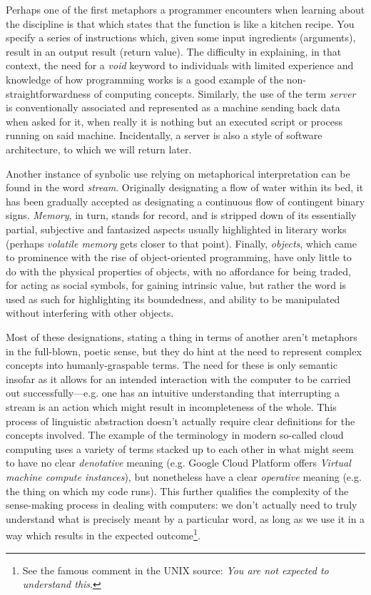 \documentclass{article}
\begin{document}
Perhaps one of the first metaphors a programmer encounters when learning about the discipline is that which states that the function is like a kitchen recipe. You specify a series of instructions which, given some input ingredients (arguments), result in an output result (return value). The difficulty in explaining, in that context, the need for a \emph{void} keyword to individuals with limited experience and knowledge of how programming works is a good example of the non-straightforwardness of computing concepts. Similarly, the use of the term \emph{server} is conventionally associated and represented as a machine sending back data when asked for it, when really it is nothing but an executed script or process running on said machine. Incidentally, a server is also a style of software architecture, to which we will return later.

Another instance of synbolic use relying on metaphorical interpretation can be found in the word \emph{stream}. Originally designating a flow of water within its bed, it has been gradually accepted as designating a continuous flow of contingent binary signs. \emph{Memory}, in turn, stands for record, and is stripped down of its essentially partial, subjective and fantasized aspects usually highlighted in literary works (perhaps \emph{volatile memory} gets closer to that point). Finally, \emph{objects}, which came to prominence with the rise of object-oriented programming, have only little to do with the physical properties of objects, with no affordance for being traded, for acting as social symbols, for gaining intrinsic value, but rather the word is used as such for highlighting its boundedness, and ability to be manipulated without interfering with other objects.

Most of these designations, stating a thing in terms of another aren't metaphors in the full-blown, poetic sense, but they do hint at the need to represent complex concepts into humanly-graspable terms. The need for these is only semantic insofar as it allows for an intended interaction with the computer to be carried out successfully—e.g. one has an intuitive understanding that interrupting a stream is an action which might result in incompleteness of the whole. This process of linguistic abstraction doesn't actually require clear definitions for the concepts involved. The example of the terminology in modern so-called cloud computing uses a variety of terms stacked up to each other in what might seem to have no clear \emph{denotative} meaning (e.g. Google Cloud Platform offers \emph{Virtual machine compute instances}), but nonetheless have a clear \emph{operative} meaning (e.g. the thing on which my code runs). This further qualifies the complexity of the sense-making process in dealing with computers: we don't actually need to truly understand what is precisely meant by a particular word, as long as we use it in a way which results in the expected outcome\footnote{See the famous comment in the UNIX source: \emph{You are not expected to understand this}.}.
\end{document}
